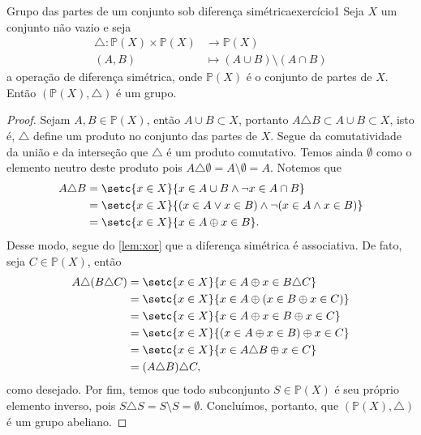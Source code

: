 \begin{exercício}{Grupo das partes de um conjunto sob diferença simétrica}{exercício1}
    Seja \(X\) um conjunto não vazio e seja
    \begin{align*}
        \triangle : \mathbb{P}(X) \times \mathbb{P}(X) &\to \mathbb{P}(X)\\
                                                 (A,B) &\mapsto (A \cup B) \setminus (A \cap B)
    \end{align*}
    a operação de diferença simétrica, onde \(\mathbb{P}(X)\) é o conjunto de partes de \(X\). Então \((\mathbb{P}(X), \triangle)\) é um grupo.
\end{exercício}
\begin{proof}
    Sejam \(A, B \in \mathbb{P}(X)\), então \(A \cup B \subset X\), portanto \(A \triangle B \subset A \cup B \subset X\), isto é, \(\triangle\) define um produto no conjunto das partes de \(X\). Segue da comutatividade da união e da interseção que \(\triangle\) é um produto comutativo. Temos ainda \(\emptyset\) como o elemento neutro deste produto pois \(A \triangle \emptyset = A \setminus \emptyset = A.\) Notemos que
    \begin{align*}
        A \triangle B &= \setc{x \in X}{x \in A \cup B \land \neg x \in A \cap B}\\
                      &= \setc{x \in X}{(x \in A \lor x \in B) \land \neg (x \in A \land x \in B)}\\
                      &= \setc{x \in X}{x \in A \oplus x \in B}.
    \end{align*}
    Desse modo, segue do \cref{lem:xor} que a diferença simétrica é associativa. De fato, seja \(C \in \mathbb{P}(X)\), então
    \begin{align*}
        A \triangle (B \triangle C) &= \setc{x \in X}{x \in A \oplus x \in B \triangle C}\\
                                    &= \setc{x \in X}{x \in A \oplus (x \in B \oplus x \in C)}\\
                                    &= \setc{x \in X}{x \in A \oplus x \in B \oplus x \in C}\\
                                    &= \setc{x \in X}{(x \in A \oplus x \in B) \oplus x \in C}\\
                                    &= \setc{x \in X}{x \in A \triangle B \oplus x \in C}\\
                                    &= (A \triangle B) \triangle C,
    \end{align*}
    como desejado. Por fim, temos que todo subconjunto \(S \in \mathbb{P}(X)\) é seu próprio elemento inverso, pois \(S \triangle S = S \setminus S = \emptyset\). Concluímos, portanto, que \((\mathbb{P}(X), \triangle)\) é um grupo abeliano.
\end{proof}
